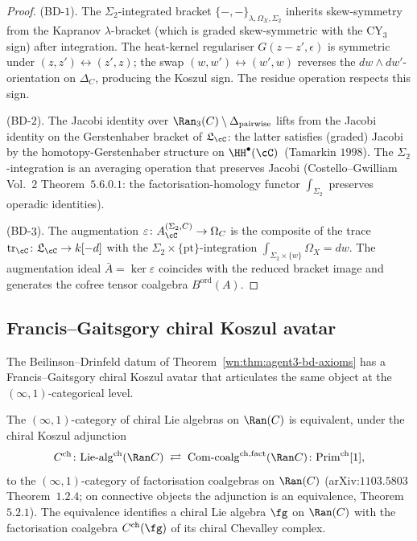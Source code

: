 \begin{proof}
(BD-$1$). The $\Sigma_2$-integrated bracket $\{-,-\}_{\lambda,\Omega_X,\Sigma_2}$ inherits skew-symmetry from the Kapranov $\lambda$-bracket (which is graded skew-symmetric with the CY$_3$ sign) after integration. The heat-kernel regulariser $G(z-z',\epsilon)$ is symmetric under $(z,z')\leftrightarrow(z',z)$; the swap $(w,w')\leftrightarrow(w',w)$ reverses the $dw\wedge dw'$-orientation on $\Delta_C$, producing the Koszul sign. The residue operation respects this sign.

(BD-$2$). The Jacobi identity over $\Ran_3(C)\setminus\Delta_{\mathrm{pairwise}}$ lifts from the Jacobi identity on the Gerstenhaber bracket of $\mathfrak{L}_\cC$: the latter satisfies (graded) Jacobi by the homotopy-Gerstenhaber structure on $\HH^\bullet(\cC)$~(Tamarkin $1998$). The $\Sigma_2$-integration is an averaging operation that preserves Jacobi (Costello--Gwilliam Vol.~$2$ Theorem~$5.6.0.1$: the factorisation-homology functor $\int_{\Sigma_2}$ preserves operadic identities).

(BD-$3$). The augmentation $\varepsilon\colon A^{(\Sigma_2,C)}_\cC\to\Omega_C$ is the composite of the trace $\mathrm{tr}_\cC\colon \mathfrak{L}_\cC\to k[-d]$ with the $\Sigma_2\times\{\mathrm{pt}\}$-integration $\int_{\Sigma_2\times\{w\}}\Omega_X=dw$. The augmentation ideal $\bar A=\ker\varepsilon$ coincides with the reduced bracket image and generates the cofree tensor coalgebra $B^{\mathrm{ord}}(A)$.
\end{proof}

\subsection{Francis--Gaitsgory chiral Koszul avatar}
\label{wn:subsec:agent3-fg-koszul-avatar}

The Beilinson--Drinfeld datum of Theorem~\ref{wn:thm:agent3-bd-axioms} has a Francis--Gaitsgory chiral Koszul avatar that articulates the same object at the $(\infty,1)$-categorical level.

\begin{theorem}
\label{wn:thm:agent3-chiral-koszul-equivalence}
\ClaimStatusProvedElsewhere{}
The $(\infty,1)$-category of chiral Lie algebras on $\Ran(C)$ is equivalent, under the chiral Koszul adjunction
\[
 C^{\mathrm{ch}}\colon
 \mathrm{Lie}\text{-}\mathrm{alg}^{\mathrm{ch}}(\Ran C)
 \;\rightleftarrows\;
 \mathrm{Com}\text{-}\mathrm{coalg}^{\mathrm{ch,fact}}(\Ran C)
 \colon\mathrm{Prim}^{\mathrm{ch}}[1],
\]
to the $(\infty,1)$-category of factorisation coalgebras on $\Ran(C)$ \textup{(}arXiv:$1103.5803$ Theorem~$1.2.4$; on connective objects the adjunction is an equivalence, Theorem~$5.2.1$\textup{)}. The equivalence identifies a chiral Lie algebra $\fg$ on $\Ran(C)$ with the factorisation coalgebra $C^{\mathrm{ch}}(\fg)$ of its chiral Chevalley complex.
\end{theorem}


